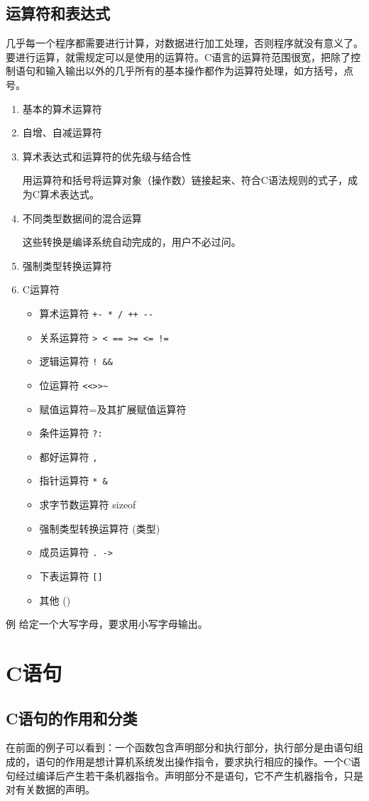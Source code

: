 \subsection{运算符和表达式}
几乎每一个程序都需要进行计算，对数据进行加工处理，否则程序就没有意义了。要进行运算，就需规定可以是使用的运算符。C语言的运算符范围很宽，把除了控制语句和输入输出以外的几乎所有的基本操作都作为运算符处理，如方括号，点号。
\begin{enumerate}
	\item 基本的算术运算符
	\item 自增、自减运算符
	\item 算术表达式和运算符的优先级与结合性

		用运算符和括号将运算对象（操作数）链接起来、符合C语法规则的式子，成为C算术表达式。
	\item 不同类型数据间的混合运算

		这些转换是编译系统自动完成的，用户不必过问。
	\item 强制类型转换运算符
	\item C运算符

		\begin{itemize}
			\item 算术运算符	\verb|+- * / ++ --|
			\item 关系运算符	\verb|> < == >= <= !=|
			\item 逻辑运算符 	\verb|! && |
			\item 位运算符		\verb|<<>>~ |
			\item 赋值运算符=及其扩展赋值运算符
			\item 条件运算符	\verb|?:|
			\item 都好运算符	\verb|,|
			\item 指针运算符	\verb|* &|
			\item 求字节数运算符	sizeof
			\item 强制类型转换运算符	(类型)
			\item 成员运算符	\verb|. ->|
			\item 下表运算符	\verb|[]|
			\item 其他  ()
		\end{itemize}
\end{enumerate}

例 给定一个大写字母，要求用小写字母输出。

\section{C语句}
\subsection{C语句的作用和分类}
在前面的例子可以看到：一个函数包含声明部分和执行部分，执行部分是由语句组成的，语句的作用是想计算机系统发出操作指令，要求执行相应的操作。一个C语句经过编译后产生若干条机器指令。声明部分不是语句，它不产生机器指令，只是对有关数据的声明。

